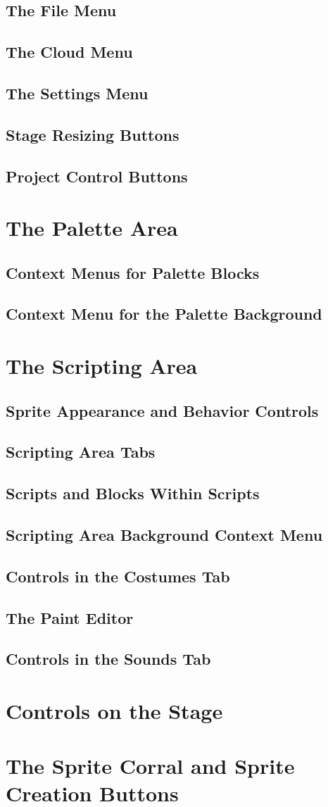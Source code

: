 \documentclass{report}
\begin{document}
\subsection{The File Menu}
\subsection{The Cloud Menu}
\subsection{The Settings Menu}
\subsection{Stage Resizing Buttons}
\subsection{Project Control Buttons}
\section{The Palette Area}
\subsection{Context Menus for Palette Blocks}
\subsection{Context Menu for the Palette Background}
\section{The Scripting Area}
\subsection{Sprite Appearance and Behavior Controls}
\subsection{Scripting Area Tabs}
\subsection{Scripts and Blocks Within Scripts}
\subsection{Scripting Area Background Context Menu}
\subsection{Controls in the Costumes Tab}
\subsection{The Paint Editor}
\subsection{Controls in the Sounds Tab}
\section{Controls on the Stage}
\section{The Sprite Corral and Sprite Creation Buttons}
\end{document}
